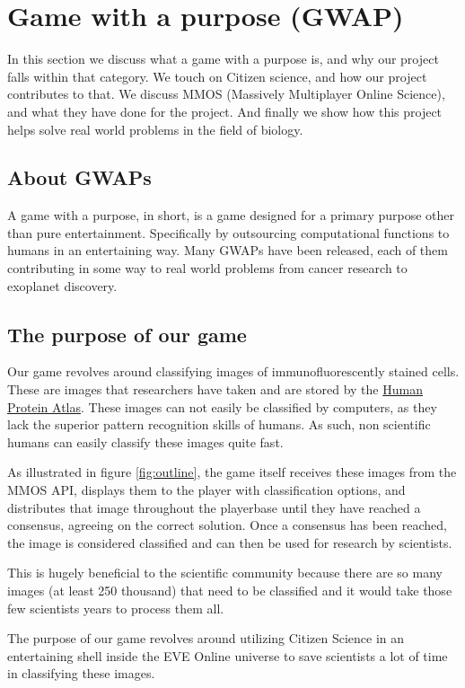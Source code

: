 \section{Game with a purpose (GWAP)}\label{sec:gwap}
In this section we discuss what a game with a purpose is, and why our project falls within that category. We touch on Citizen science, and how our project contributes to that. We discuss MMOS (Massively Multiplayer Online Science), and what they have done for the project. And finally we show how this project helps solve real world problems in the field of biology.

\subsection{About GWAPs}
A game with a purpose, in short, is a game designed for a primary purpose other than pure entertainment. Specifically by outsourcing computational functions to humans in an entertaining way. Many GWAPs have been released, each of them contributing in some way to real world problems from cancer research to exoplanet discovery. 

\subsection{The purpose of our game}
Our game revolves around classifying images of immunofluorescently stained cells. These are images that researchers have taken and are stored by the \href{http://www.proteinatlas.org/}{Human Protein Atlas}. These images can not easily be classified by computers, as they lack the superior pattern recognition skills of humans. As such, non scientific humans can easily classify these images quite fast.

As illustrated in figure \ref{fig:outline}, the game itself receives these images from the MMOS API, displays them to the player with classification options, and distributes that image throughout the playerbase until they have reached a consensus, agreeing on the correct solution. Once a consensus has been reached, the image is considered classified and can then be used for research by scientists.

 This is hugely beneficial to the scientific community because there are so many images (at least 250 thousand) that need to be classified and it would take those few scientists years to process them all. 

 The purpose of our game revolves around utilizing Citizen Science in an entertaining shell inside the EVE Online universe to save scientists a lot of time in classifying these images.

